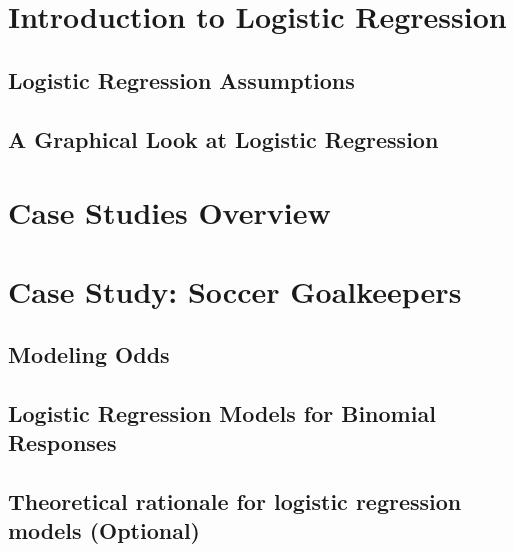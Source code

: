 \documentclass[
]{krantz}
\begin{document}
\hypertarget{introduction-to-logistic-regression}{%
\section{Introduction to Logistic Regression}\label{introduction-to-logistic-regression}}

\hypertarget{logistic-regression-assumptions}{%
\subsection{Logistic Regression Assumptions}\label{logistic-regression-assumptions}}

\hypertarget{a-graphical-look-at-logistic-regression}{%
\subsection{A Graphical Look at Logistic Regression}\label{a-graphical-look-at-logistic-regression}}

\hypertarget{case-studies-overview-1}{%
\section{Case Studies Overview}\label{case-studies-overview-1}}

\hypertarget{case-study-soccer-goalkeepers}{%
\section{Case Study: Soccer Goalkeepers}\label{case-study-soccer-goalkeepers}}

\hypertarget{modeling-odds}{%
\subsection{Modeling Odds}\label{modeling-odds}}

\hypertarget{logistic-regression-models-for-binomial-responses}{%
\subsection{Logistic Regression Models for Binomial Responses}\label{logistic-regression-models-for-binomial-responses}}

\hypertarget{theoretical-rationale-for-logistic-regression-models-optional}{%
\subsection{Theoretical rationale for logistic regression models (Optional)}\label{theoretical-rationale-for-logistic-regression-models-optional}}
\end{document}

